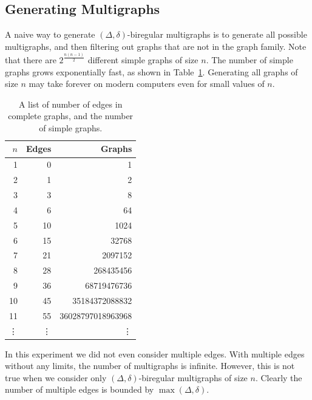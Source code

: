 \subsection{Generating Multigraphs} \label{sec:implementation:generating_multigraphs}
A naive way to generate $(\Delta, \delta)$-biregular multigraphs is to generate all possible multigraphs, and then filtering out graphs that are not in the graph family.
Note that there are \(2^{\frac{n(n-1)}{2}}\) different simple graphs of size $n$.
The number of simple graphs grows exponentially fast, as shown in Table~\ref{tbl:graph_count_growth}.
Generating all graphs of size $n$ may take forever on modern computers even for small values of $n$.
\begin{table}[H]
  \centering
  \begin{tabular}{r|rr}
    \toprule
    $n$&Edges&Graphs\\
    \midrule
    1 & 0 &1\\
    2 & 1 &2\\
    3 & 3 &8\\
    4 & 6 &64\\
    5 & 10 &1024\\
    6 & 15 &32768\\
    7 & 21 &2097152\\
    8 & 28 &268435456\\
    9 & 36 &68719476736\\
    10 & 45 &35184372088832\\
    11 & 55 &36028797018963968\\
    \vdots & \vdots &\vdots\\
    \bottomrule
  \end{tabular}
  \caption{
    A list of number of edges in complete graphs, and the number of simple graphs.
  }
  \label{tbl:graph_count_growth}
\end{table}

In this experiment we did not even consider multiple edges.
With multiple edges without any limits, the number of multigraphs is infinite.
However, this is not true when we consider only $(\Delta, \delta)$-biregular multigraphs of size $n$.
Clearly the number of multiple edges is bounded by $\max(\Delta, \delta)$.

